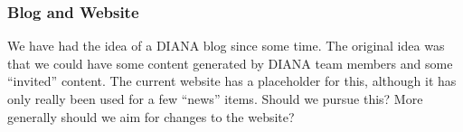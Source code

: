 \begin{frame}
\frametitle{Blog and Website}

We have had the idea of a DIANA blog since some time. The original idea
was that we could have some content generated by DIANA team members and 
some ``invited'' content.
\vskip 0.15in
The current website has a placeholder for this, although it has only really
been used for a few ``news'' items. 
\vskip 0.15in
Should we pursue this? More generally should we aim for changes to the website?

\end{frame}


